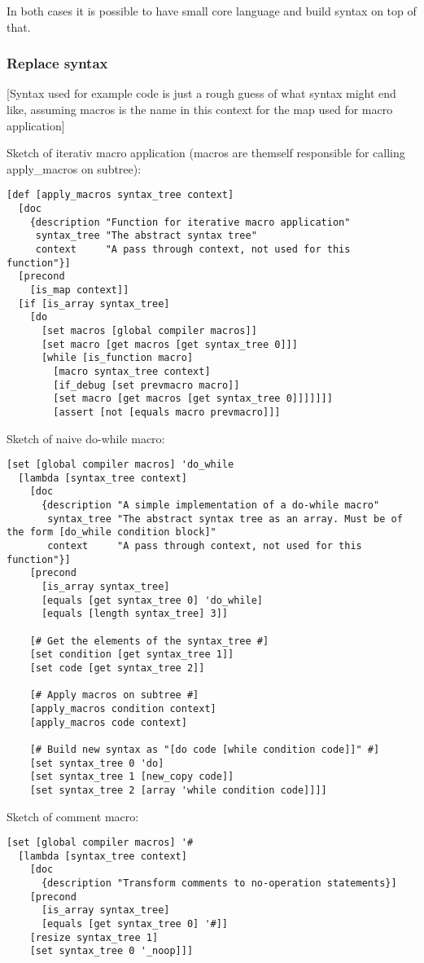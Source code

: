 In both cases it is possible to have small core language and build syntax on top of that.

\subsubsection{Replace syntax}
[Syntax used for example code is just a rough guess of what syntax might end like, assuming macros is the name in this context for the map used for macro application]

Sketch of iterativ macro application (macros are themself responsible for calling apply\_macros on subtree):
\begin{verbatim}
[def [apply_macros syntax_tree context]
  [doc 
    {description "Function for iterative macro application"
     syntax_tree "The abstract syntax tree"
     context     "A pass through context, not used for this function"}]
  [precond
    [is_map context]]
  [if [is_array syntax_tree]
    [do
      [set macros [global compiler macros]]
      [set macro [get macros [get syntax_tree 0]]]
      [while [is_function macro]
        [macro syntax_tree context]
        [if_debug [set prevmacro macro]]
        [set macro [get macros [get syntax_tree 0]]]]]]]
        [assert [not [equals macro prevmacro]]]
\end{verbatim}

Sketch of naive do-while macro:
\begin{verbatim}
[set [global compiler macros] 'do_while 
  [lambda [syntax_tree context]
    [doc
      {description "A simple implementation of a do-while macro"
       syntax_tree "The abstract syntax tree as an array. Must be of the form [do_while condition block]"
       context     "A pass through context, not used for this function"}]
    [precond
      [is_array syntax_tree]
      [equals [get syntax_tree 0] 'do_while]
      [equals [length syntax_tree] 3]]

    [# Get the elements of the syntax_tree #]
    [set condition [get syntax_tree 1]]
    [set code [get syntax_tree 2]]

    [# Apply macros on subtree #]
    [apply_macros condition context]
    [apply_macros code context]

    [# Build new syntax as "[do code [while condition code]]" #]
    [set syntax_tree 0 'do]
    [set syntax_tree 1 [new_copy code]]
    [set syntax_tree 2 [array 'while condition code]]]]
\end{verbatim}

Sketch of comment macro:
\begin{verbatim}
[set [global compiler macros] '#
  [lambda [syntax_tree context]
    [doc 
      {description "Transform comments to no-operation statements}]
    [precond
      [is_array syntax_tree]
      [equals [get syntax_tree 0] '#]]
    [resize syntax_tree 1]
    [set syntax_tree 0 '_noop]]]
\end{verbatim}

